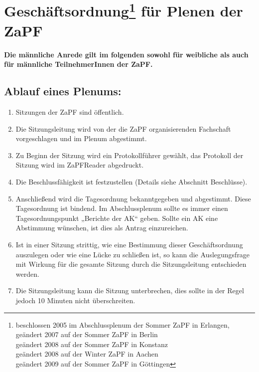 



\chapter*{Geschäftsordnung\footnote{beschlossen 2005 im Abschlussplenum der Sommer ZaPF in Erlangen,\\ geändert 2007 auf der Sommer ZaPF in Berlin\\geändert 2008 auf der Sommer ZaPF in Konstanz\\geändert 2008 auf der Winter ZaPF in Aachen\\geändert 2009 auf der Sommer ZaPF in Göttingen} für Plenen der ZaPF}


\noindent \textbf{Die männliche Anrede gilt im folgenden sowohl für
weibliche als auch für männliche
 TeilnehmerInnen der ZaPF.}

\section{Ablauf eines Plenums:}
\begin{enumerate}

\item{Sitzungen der ZaPF sind öffentlich.}

\item{Die Sitzungsleitung wird von der die ZaPF organisierenden Fachschaft vorgeschlagen und im
Plenum abgestimmt.}

\item{Zu Beginn der Sitzung wird ein Protokollführer gewählt, das Protokoll der Sitzung wird im ZaPFReader
abgedruckt.}

\item{Die Beschlussfähigkeit ist festzustellen (Details siehe Abschnitt Beschlüsse).}

\item{Anschließend wird die Tagesordnung bekanntgegeben und abgestimmt. Diese Tagesordnung ist
bindend. Im Abschlussplenum sollte es immer einen Tagesordnungspunkt „Berichte der AK“ geben.
Sollte ein AK eine Abstimmung wünschen, ist dies als Antrag einzureichen.}

\item{ Ist in einer Sitzung strittig, wie eine Bestimmung dieser Geschäftsordnung auszulegen oder wie eine
Lücke zu schließen ist, so kann die Auslegungsfrage mit Wirkung für die gesamte Sitzung durch die
Sitzungsleitung entschieden werden.}

\item{Die Sitzungsleitung kann die Sitzung unterbrechen, dies sollte in der Regel jedoch 10 Minuten nicht
überschreiten.}
\end{enumerate}

